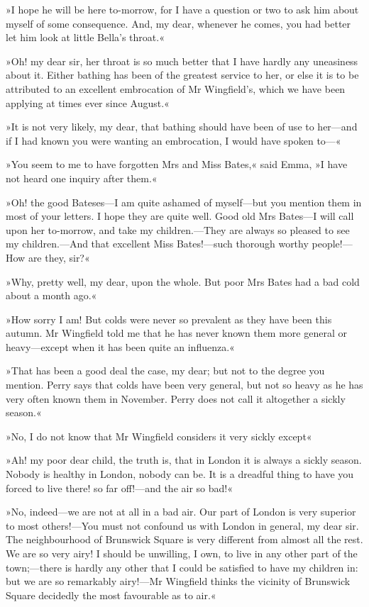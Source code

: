 »I hope he will be here to-morrow, for I have a question or two to ask him about myself of some consequence. And, my dear, whenever he comes, you had better let him look at little Bella's throat.«

»Oh! my dear sir, her throat is so much better that I have hardly any uneasiness about it. Either bathing has been of the greatest service to her, or else it is to be attributed to an excellent embrocation of Mr Wingfield's, which we have been applying at times ever since August.«

»It is not very likely, my dear, that bathing should have been of use to her—and if I had known you were wanting an embrocation, I would have spoken to—«

»You seem to me to have forgotten Mrs and Miss Bates,« said Emma, »I have not heard one inquiry after them.«

»Oh! the good Bateses—I am quite ashamed of myself—but you mention them in most of your letters. I hope they are quite well. Good old Mrs Bates—I will call upon her to-morrow, and take my children.—They are always so pleased to see my children.—And that excellent Miss Bates!—such thorough worthy people!—How are they, sir?«

»Why, pretty well, my dear, upon the whole. But poor Mrs Bates had a bad cold about a month ago.«

»How sorry I am! But colds were never so prevalent as they have been this autumn. Mr Wingfield told me that he has never known them more general or heavy—except when it has been quite an influenza.«

»That has been a good deal the case, my dear; but not to the degree you mention. Perry says that colds have been very general, but not so heavy as he has very often known them in November. Perry does not call it altogether a sickly season.«

»No, I do not know that Mr Wingfield considers it very sickly except\longdash«

»Ah! my poor dear child, the truth is, that in London it is always a sickly season. Nobody is healthy in London, nobody can be. It is a dreadful thing to have you forced to live there! so far off!—and the air so bad!«

»No, indeed—we are not at all in a bad air. Our part of London is very superior to most others!—You must not confound us with London in general, my dear sir. The neighbourhood of Brunswick Square is very different from almost all the rest. We are so very airy! I should be unwilling, I own, to live in any other part of the town;—there is hardly any other that I could be satisfied to have my children in: but we are so remarkably airy!—Mr Wingfield thinks the vicinity of Brunswick Square decidedly the most favourable as to air.«

